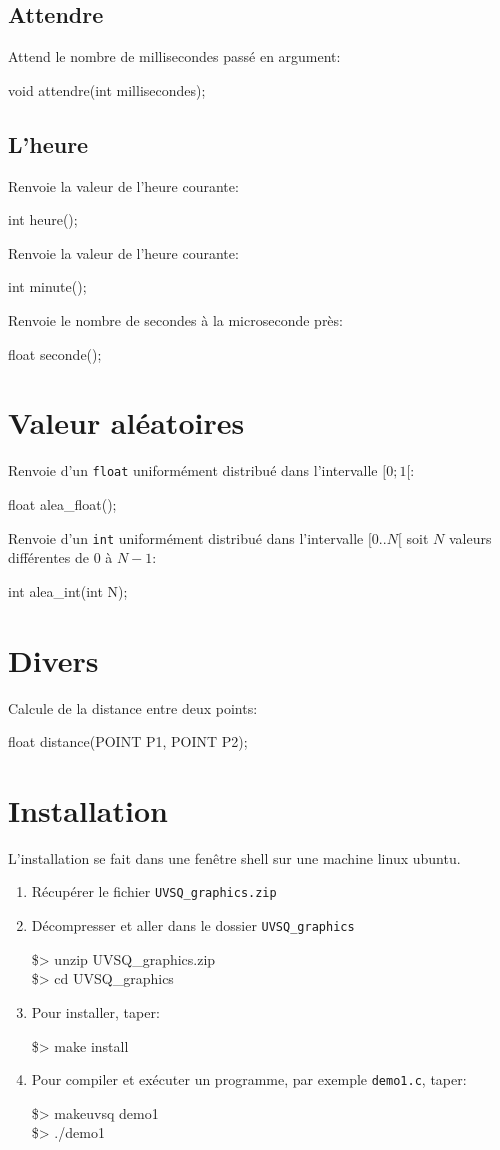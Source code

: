 \documentclass{article}
\newcommand\code[1]{
\begin{mdframed}[linecolor=purple,backgroundcolor=blue!10]
{\tt
#1
}
\end{mdframed}
}
\begin{document}
\subsection{Attendre}
Attend le nombre de millisecondes passé en argument:
\code{
void attendre(int millisecondes);
}

\subsection{L'heure}
Renvoie la valeur de l'heure courante:
\code{
int heure();
}

Renvoie la valeur de l'heure courante:
\code{
int minute();
}

Renvoie le nombre de secondes à la microseconde près:
\code{
float seconde();
}

\section{Valeur aléatoires}
Renvoie d'un \texttt{float} uniformément distribué dans l'intervalle $[0;1[$:
\code{
float alea\_float();
}

Renvoie d'un \texttt{int} uniformément distribué dans l'intervalle $[0..N[$
soit $N$ valeurs différentes de 0 à $N-1$:
\code{
int alea\_int(int N);
}

\section{Divers}
Calcule de la distance entre deux points:
\code{
float distance(POINT P1, POINT P2);
}

\section{Installation}
L'installation se fait dans une fenêtre shell sur une machine linux ubuntu.
\begin{enumerate}
\item Récupérer le fichier \texttt{UVSQ\_graphics.zip}
\item Décompresser et aller dans le dossier \texttt{UVSQ\_graphics}
\code{
\$> unzip UVSQ\_graphics.zip\\
\$> cd UVSQ\_graphics
}
\item Pour installer, taper:
\code{
\$> make install
}
\item Pour compiler et exécuter un programme, par exemple \texttt{demo1.c}, taper:
\code{
\$> makeuvsq demo1\\
\$> ./demo1
}
\end{enumerate}
\end{document}

